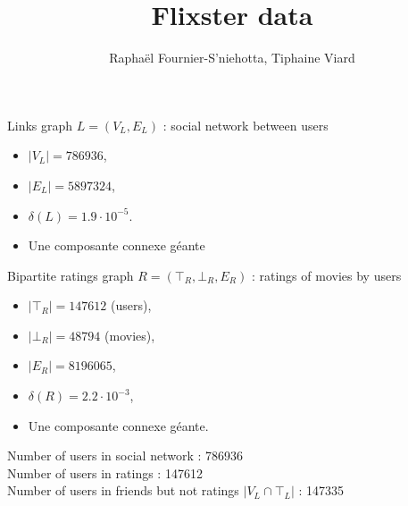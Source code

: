 \documentclass[a4paper, 11pt]{article}
\title{Flixster data}
\author{Raphaël Fournier-S'niehotta, Tiphaine Viard}
\date{}
\begin{document}
	\maketitle
	
	Links graph $L =( V_L, E_L)$ : social network between users
	\begin{itemize}
		\item $|V_L|=786936$,
		\item $|E_L|=5897324$,
		\item $\delta(L)=1.9\cdot 10^{-5}$. %
		\item Une composante connexe géante
	\end{itemize}
	
	Bipartite ratings graph $R =( \top_R, \bot_R, E_R)$ : ratings of movies by users
	\begin{itemize}
		\item $|\top_R|=147612$ (users),
		\item $|\bot_R|=48794$ (movies),
		\item $|E_R|=8196065$,
		\item $\delta(R)=2.2\cdot 10^{-3}$,
		\item Une composante connexe géante.
	\end{itemize}
	
	\noindent
	Number of users in social network : 786936\\
	Number of users in ratings : 147612\\
	Number of users in friends but not ratings $|V_L \cap \top_L|$ : 147335\\
	
	
	
\end{document}

